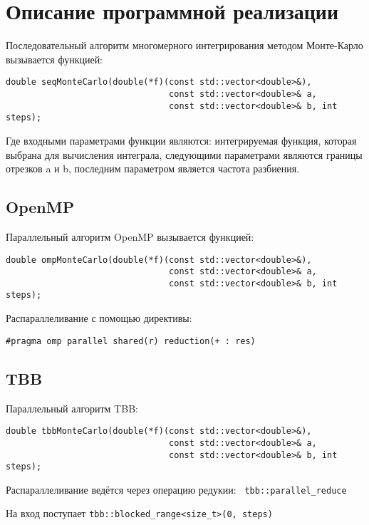 \documentclass{report}
\begin{document}
\section*{Описание программной реализации}
\par Последовательный алгоритм многомерного интегрирования методом Монте-Карло вызывается функцией:
\begin{lstlisting}
double seqMonteCarlo(double(*f)(const std::vector<double>&),
                                const std::vector<double>& a,
                                const std::vector<double>& b, int steps);
\end{lstlisting}
\par Где входными параметрами функции являются: интегрируемая функция, которая выбрана для вычисления интеграла, следующими параметрами являются границы отрезков a и b, последним параметром является частота разбиения.
\subsection*{OpenMP}
\par Параллельный алгоритм OpenMP вызывается функцией:
\begin{lstlisting}
double ompMonteCarlo(double(*f)(const std::vector<double>&),
                                const std::vector<double>& a,
                                const std::vector<double>& b, int steps);
\end{lstlisting}
\par Распараллеливание с помощью директивы:
\par\verb|#pragma omp parallel shared(r) reduction(+ : res)|
\subsection*{TBB}
\par Параллельный алгоритм TBB:
\begin{lstlisting}
double tbbMonteCarlo(double(*f)(const std::vector<double>&),
                                const std::vector<double>& a,
                                const std::vector<double>& b, int steps);
\end{lstlisting}
\par Распараллеливание ведётся через операцию редукии: \verb| tbb::parallel_reduce|\par На вход поступает \verb|tbb::blocked_range<size_t>(0, steps)|
\end{document}
